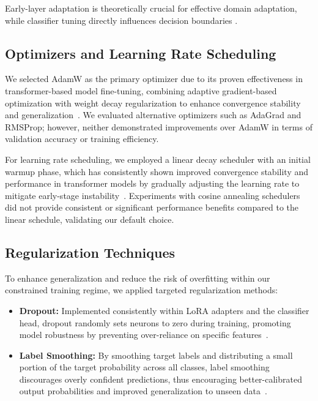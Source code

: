 \documentclass[letterpaper]{article}
\begin{document}
Early-layer adaptation is theoretically crucial for effective domain adaptation, while classifier tuning directly influences decision boundaries \cite{howard2018universal}.

\subsection{Optimizers and Learning Rate Scheduling}
We selected AdamW as the primary optimizer due to its proven effectiveness in transformer-based model fine-tuning, combining adaptive gradient-based optimization with weight decay regularization to enhance convergence stability and generalization~\cite{loshchilov2017decoupled}. We evaluated alternative optimizers such as AdaGrad and RMSProp; however, neither demonstrated improvements over AdamW in terms of validation accuracy or training efficiency.

For learning rate scheduling, we employed a linear decay scheduler with an initial warmup phase, which has consistently shown improved convergence stability and performance in transformer models by gradually adjusting the learning rate to mitigate early-stage instability~\cite{liu2019roberta}. Experiments with cosine annealing schedulers did not provide consistent or significant performance benefits compared to the linear schedule, validating our default choice.

\subsection{Regularization Techniques}
To enhance generalization and reduce the risk of overfitting within our constrained training regime, we applied targeted regularization methods:
\begin{itemize}
    \item \textbf{Dropout:} Implemented consistently within LoRA adapters and the classifier head, dropout randomly sets neurons to zero during training, promoting model robustness by preventing over-reliance on specific features~\cite{srivastava2014dropout}.
    \item \textbf{Label Smoothing:} By smoothing target labels and distributing a small portion of the target probability across all classes, label smoothing discourages overly confident predictions, thus encouraging better-calibrated output probabilities and improved generalization to unseen data~\cite{szegedy2016rethinking}.
\end{itemize}
\end{document}
